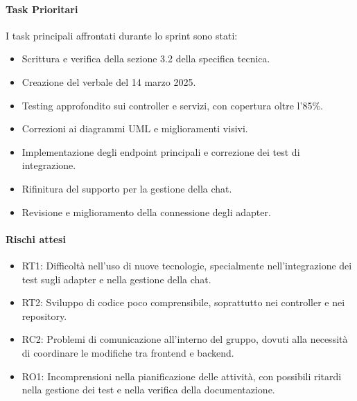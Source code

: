 \documentclass{article}
\begin{document}
            \paragraph{Task Prioritari}
            I task principali affrontati durante lo sprint sono stati:
            \begin{itemize}
                \item Scrittura e verifica della sezione 3.2 della specifica tecnica.
                \item Creazione del verbale del 14 marzo 2025.
                \item Testing approfondito sui controller e servizi, con copertura oltre l'85\%.
                \item Correzioni ai diagrammi UML e miglioramenti visivi.
                \item Implementazione degli endpoint principali e correzione dei test di integrazione.
                \item Rifinitura del supporto per la gestione della chat.
                \item Revisione e miglioramento della connessione degli adapter.
            \end{itemize}
            
            \paragraph{Rischi attesi}
            \begin{itemize}
                \item RT1: Difficoltà nell’uso di nuove tecnologie, specialmente nell’integrazione dei test sugli adapter e nella gestione della chat.
                \item RT2: Sviluppo di codice poco comprensibile, soprattutto nei controller e nei repository.
                \item RC2: Problemi di comunicazione all’interno del gruppo, dovuti alla necessità di coordinare le modifiche tra frontend e backend.
                \item RO1: Incomprensioni nella pianificazione delle attività, con possibili ritardi nella gestione dei test e nella verifica della documentazione.
            \end{itemize}
            
\end{document}

